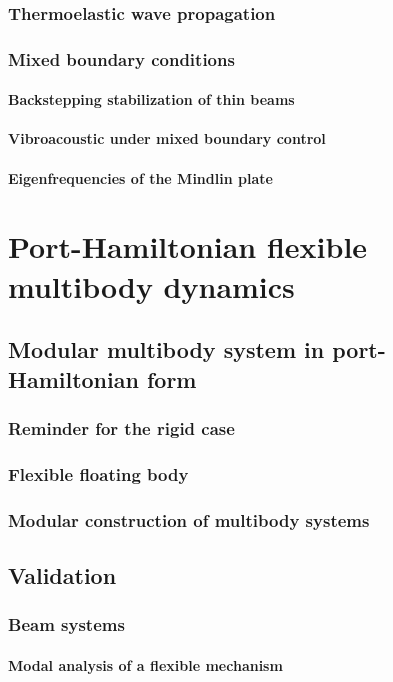 \documentclass[a4paper,11pt]{book}
\begin{document}
\section{Thermoelastic wave propagation}

\section{Mixed boundary conditions}
\subsection{Backstepping stabilization of thin beams}
\subsection{Vibroacoustic under mixed boundary control}
\subsection{Eigenfrequencies of the Mindlin plate}

\part{Port-Hamiltonian flexible multibody dynamics}
\chapter{Modular multibody system in port-Hamiltonian form}
\section{Reminder for the rigid case}
\section{Flexible floating body}
\section{Modular construction of multibody systems}

\chapter{Validation}
\section{Beam systems}
\subsection{Modal analysis of a flexible mechanism}
\end{document}
